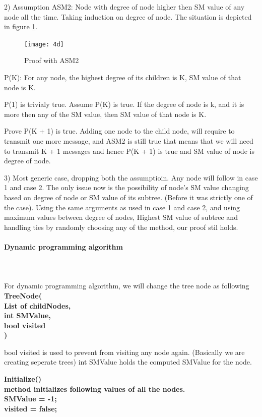 2) Assumption ASM2: Node with degree of node higher then SM value of any node all the time. 
Taking induction on degree of node. The situation is depicted in figure \ref{fig:4d}. 

\begin{figure}[4d]
    \centering
    \texttt{[image: 4d]}
    \caption{Proof with ASM2}
    \label{fig:4d}
\end{figure}
 
P(K): For any node, the highest degree of  its children is K, SM value of that node is K. 

P(1) is trivialy true. 
Assume P(K) is true. If the degree of node is k, and it is more then any of the SM value, then SM value of that node is K.  

Prove P(K + 1) is true. 
Adding one node to the child node, will require to transmit one more message, and ASM2 is still true that means that we will need to transmit K + 1 messages and hence P(K + 1) is true and SM value of node is degree of node.  

3) Most generic case, dropping both the assumptioin. 
Any node will follow in case 1 and case 2. The only issue now is the possibility of node's SM value changing based on degree of node or SM value of its subtree. (Before it was strictly one of the case). Using the same arguments as used in case 1 and case 2, and using maximum values between {degree of nodes, Highest SM  value of subtree} and handling ties by randomly choosing any of the method, our proof stil holds. 

\paragraph{Dynamic programming algorithm} \\
\\
For dynamic programming algorithm, we will change the tree node as following \\
\textbf{TreeNode(\\
List of childNodes,  \\
int SMValue, \\
bool visited \\
)}

bool visited is used to prevent from visiting any node again. (Basically we are creating seperate trees)
int SMValue holds the computed SMValue for the node. 

\textbf{Initialize() \\
method initializes following values of all the nodes. \\
SMValue = -1; \\
visited = false;\\
}

